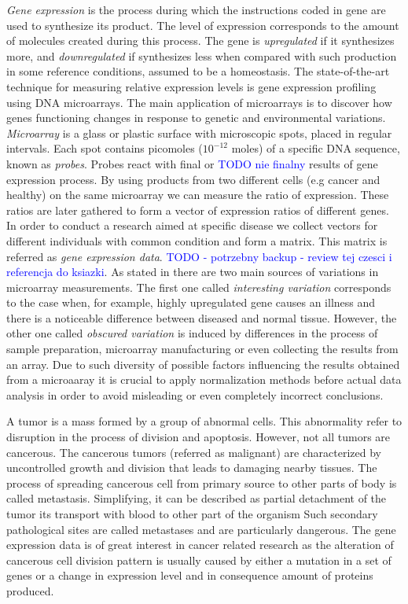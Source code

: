 \documentclass[12pt, wide]{mwart}
\begin{document}
\textit{Gene expression} is the process during which the instructions coded in gene are used to synthesize its product. The level of expression corresponds to the amount of molecules created during this process. The gene is \textit{upregulated} if it synthesizes more, and \textit{downregulated} if synthesizes less when compared with such production in some reference conditions, assumed to be a homeostasis. The state-of-the-art technique for measuring relative expression levels is gene expression profiling using DNA microarrays. The main application of microarrays is to discover how genes functioning changes in response to genetic and environmental variations. \textit{Microarray} is a glass or plastic surface with microscopic spots, placed in regular intervals. Each spot contains picomoles ($10^{-12}$ moles) of a specific DNA sequence, known as \textit{probes}. Probes react with final or \textcolor{blue}{TODO nie finalny} results of gene expression process. By using products from two different cells (e.g cancer and healthy) on the same microarray we can measure the ratio of expression. These ratios are later gathered to form a vector of expression ratios of different genes. In order to conduct a research aimed at specific disease we collect vectors for different individuals with common condition and form a matrix. This matrix is referred as \textit{gene expression data}. \textcolor{blue}{TODO - potrzebny backup - review tej czesci i referencja do ksiazki}. As stated in \cite{preprocessing} there are two main sources of variations in microarray measurements. The first one called \textit{interesting variation} corresponds to the case when, for example, highly upregulated gene causes an illness and there is a noticeable difference between diseased and normal tissue. However, the other one called \textit{obscured variation} is induced by differences in the process of sample preparation, microarray manufacturing or even collecting the results from an array. Due to such diversity of possible factors influencing the results obtained from a microaaray it is crucial to apply normalization methods before actual data analysis in order to avoid misleading or even completely incorrect conclusions.

A tumor is a mass formed by a group of abnormal cells. This abnormality refer to disruption in the process of division and apoptosis. However, not all tumors are cancerous. The cancerous tumors (referred as malignant) are characterized by uncontrolled growth and division that leads to damaging nearby tissues. The process of spreading cancerous cell from primary source to other parts of body is called metastasis. Simplifying, it can be described as partial detachment of the tumor its transport with blood to other part of the organism Such secondary pathological sites are called metastases and are particularly dangerous. The gene expression data is of great interest in cancer related research as the alteration of cancerous cell division pattern is usually caused by either a mutation in a set of genes or a change in expression level and in consequence amount of proteins produced. 
\end{document}
